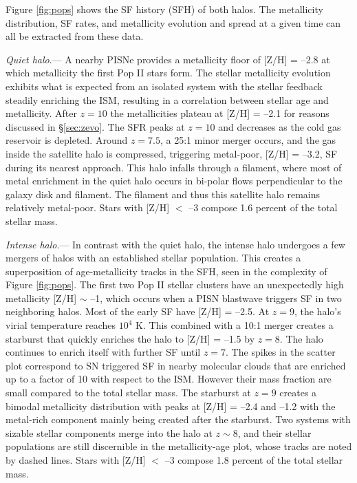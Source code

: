\documentclass[12pt]{article}
\newcommand\tento[1]{$10^{#1}$}
\begin{document}
Figure \ref{fig:pops} shows the SF history (SFH) of both halos.  The
metallicity distribution, SF rates, and metallicity evolution and
spread at a given time can all be extracted from these data.

\textit{Quiet halo}.--- A nearby PISNe provides a metallicity floor of
[Z/H] = --2.8 at which metallicity the first Pop II stars form.  The
stellar metallicity evolution exhibits what is expected from an
isolated system with the stellar feedback steadily enriching the ISM,
resulting in a correlation between stellar age and metallicity.  After
$z=10$ the metallicities plateau at [Z/H] = --2.1 for reasons
discussed in \S\ref{sec:zevo}.  The SFR peaks at $z=10$ and decreases
as the cold gas reservoir is depleted.  Around $z=7.5$, a 25:1 minor
merger occurs, and the gas inside the satellite halo is compressed,
triggering metal-poor, [Z/H] = --3.2, SF during its nearest approach.
This halo infalls through a filament, where most of metal enrichment
in the quiet halo occurs in bi-polar flows perpendicular to the galaxy
disk and filament.  The filament and thus this satellite halo remains
relatively metal-poor.  Stars with [Z/H] $<$ --3 compose 1.6 percent
of the total stellar mass.
       
\textit{Intense halo}.--- In contrast with the quiet halo, the intense
halo undergoes a few mergers of halos with an established stellar
population.  This creates a superposition of age-metallicity tracks in
the SFH, seen in the complexity of Figure \ref{fig:pops}.  The first
two Pop II stellar clusters have an unexpectedly high metallicity
[Z/H] $\sim$ --1, which occurs when a PISN blastwave triggers SF in
two neighboring halos.  Most of the early SF have [Z/H] = --2.5.  At
$z=9$, the halo's virial temperature reaches \tento{4} K.  This
combined with a 10:1 merger creates a starburst that quickly enriches
the halo to [Z/H] = --1.5 by $z=8$.  The halo continues to enrich
itself with further SF until $z=7$.  The spikes in the scatter plot
correspond to SN triggered SF in nearby molecular clouds that are
enriched up to a factor of 10 with respect to the ISM.  However their
mass fraction are small compared to the total stellar mass.  The
starburst at $z=9$ creates a bimodal metallicity distribution with
peaks at [Z/H] = --2.4 and --1.2 with the metal-rich component mainly
being created after the starburst.  Two systems with sizable stellar
components merge into the halo at $z \sim 8$, and their stellar
populations are still discernible in the metallicity-age plot, whose
tracks are noted by dashed lines.  Stars with [Z/H] $<$ --3 compose
1.8 percent of the total stellar mass.
\end{document}
